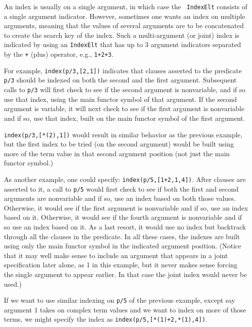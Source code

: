 \begin{description}
\begin{itemize}
\begin{itemize}
An index is usually on a single argument, in which case the {\tt
IndexElt} consists of a single argument indicator.  However, sometimes
one wants an index on multiple arguments, meaning that the values of
several arguments are to be concatenated to create the search key of
the index.  Such a multi-argument (or joint) index is indicated by
using an {\tt IndexElt} that has up to 3 argument indicators separated
by the {\tt +} (plus) operator, e.g., {\tt 1+2+3}.

For example, {\tt index(p/3,[2,1])} indicates that clauses asserted to
the predicate {\tt p/3} should be indexed on both the second and the
first argument.  Subsequent calls to {\tt p/3} will first check to see
if the second argument is nonvariable, and if so use that index, using
the main functor symbol of that argument. If the second argument is
variable, it will next check to see if the first argument is
nonvariable and if so, use that index, built on the main functor
symbol of the first argument.  

{\tt index(p/3,[*(2),1])} would result in similar behavior as the
previous example, but the first index to be tried (on the second
argument) would be built using more of the term value in that second
argument position (not just the main functor symbol.)

As another example, one could specify: {\tt index(p/5,[1+2,1,4])}.
After clauses are asserted to it, a call to {\tt p/5} would first
check to see if both the first and second arguments are nonvariable
and if so, use an index based on both those values. Otherwise, it
would see if the first argument is nonvariable and if so, use an index
based on it. Otherwise, it would see if the fourth argument is
nonvariable and if so use an index based on it. As a last resort, it
would use no index but backtrack through all the clauses in the
predicate.  In all these cases, the indexes are built using only the
main functor symbol in the indicated argument position. (Notice that
it may well make sense to include an argument that appears in a joint
specification later alone, as 1 in this example, but it never makes
sense forcing the single argument to appear earlier. In that case the
joint index would never be used.)

If we want to use similar indexing on {\tt p/5} of the previous
example, except say argument 1 takes on complex term values and we
want to index on more of those terms, we might specify the index as
{\tt index(p/5,[*(1)+2,*(1),4])}.

\end{itemize}


\end{itemize}
\end{description}
